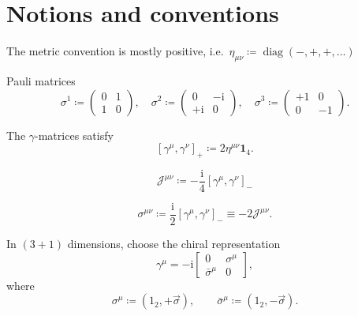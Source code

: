 \documentclass[12pt]{article}
\newcommand\mi{\mathrm{i}} %
\DeclareMathOperator{\diag}{diag}
\newcommand{\rbr}[1]{{\left(#1\right)}}
\newcommand{\sbr}[1]{{\left[#1\right]}}
\newcommand{\rfun}[2]{{#1}\mathopen{}\left(#2\right)\mathclose{}}
\begin{document}
\cite{weisskopf1936}




\appendix

\section{Notions and conventions}


The metric convention is mostly positive, i.e.\
$\eta_{\mu\nu} \coloneqq \rfun{\diag}{-, +, +, \ldots}$

Pauli matrices
\begin{equation}
\sigma^1 \coloneqq \begin{pmatrix} 0 & 1 \\ 1 & 0 \end{pmatrix},\quad
\sigma^2 \coloneqq \begin{pmatrix} 0 & -\mi \\ +\mi & 0 \end{pmatrix},\quad
\sigma^3 \coloneqq \begin{pmatrix} +1 & 0 \\ 0 & -1 \end{pmatrix}.
\end{equation}

The $\gamma$-matrices satisfy \cite[sec.~5]{weinberg1995}
\begin{equation}
\sbr{\gamma^\mu, \gamma^\nu}_+ \coloneqq 2\eta^{\mu\nu} \mathbf{1}_4.
\end{equation}

\begin{equation}
\mathscr{J}^{\mu\nu} \coloneqq -\frac{\mi}{4}\sbr{\gamma^\mu, \gamma^\nu}_-
\end{equation}

\begin{equation}
\sigma^{\mu\nu} \coloneqq \frac{\mi}{2}\sbr{\gamma^\mu, \gamma^\nu}_-
\equiv -2 \mathscr{J}^{\mu\nu}.
\end{equation}

In $\rbr{3+1}$ dimensions, choose the chiral representation
\begin{equation}
\gamma^\mu = -\mi
\begin{bmatrix}0 & \sigma^\mu \\ \bar\sigma^\mu & 0\end{bmatrix},
\end{equation}
where
\begin{equation}
\sigma^\mu \coloneqq \rbr{1_2, +\vec{\sigma}},\qquad
\bar\sigma^\mu \coloneqq \rbr{1_2, -\vec{\sigma}}.
\end{equation}
\end{document}
